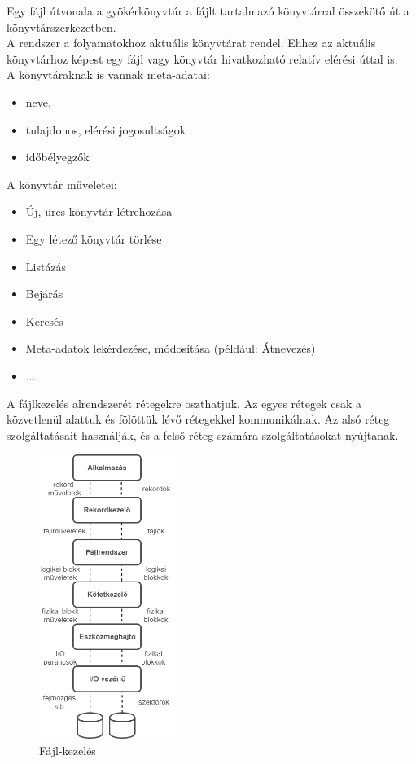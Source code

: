 \documentclass[tikz,12pt,margin=0px]{article}
\begin{document}
    \noindent Egy fájl útvonala a gyökérkönyvtár a fájlt tartalmazó könyvtárral összekötő út a könyvtárszerkezetben.\\

    \noindent A rendszer a folyamatokhoz aktuális könyvtárat rendel. Ehhez az aktuális könyvtárhoz képest egy fájl vagy könyvtár hivatkozható relatív elérési úttal is.\\

    \noindent A könyvtáraknak is vannak meta-adatai:
    \begin{itemize}[topsep=8pt,itemsep=4pt,partopsep=4pt, parsep=4pt]
        \item neve,
        \item tulajdonos, elérési jogosultságok
        \item időbélyegzők
    \end{itemize}

    \noindent A könyvtár műveletei:
    \begin{itemize}[topsep=8pt,itemsep=4pt,partopsep=4pt, parsep=4pt]
        \item Új, üres könyvtár létrehozása
        \item Egy létező könyvtár törlése
        \item Listázás
        \item Bejárás
        \item Keresés
        \item Meta-adatok lekérdezése, módosítása (például: Átnevezés)
        \item $\ldots$
    \end{itemize}

    \noindent A fájlkezelés alrendszerét rétegekre oszthatjuk. Az egyes rétegek csak a közvetlenül alattuk és fölöttük lévő rétegekkel kommunikálnak. Az alsó réteg szolgáltatásait használják, és a felső réteg számára szolgáltatásokat nyújtanak.

	\begin{figure}[H]
		\centering
		\includegraphics[width=0.4\textwidth]{img/file_system_management.png}
		\caption{Fájl-kezelés}
        \label{file_system_management}
	\end{figure}
\end{document}
